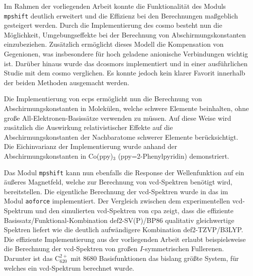 Im Rahmen der vorliegenden Arbeit konnte die Funktionalität des Moduls \texttt{mpshift} deutlich erweitert und die Effizienz bei den Berechnungen maßgeblich gesteigert werden. Durch die Implementierung des \acf{cosmo} besteht nun die Möglichkeit, Umgebungseffekte bei der Berechnung von Abschirmungskonstanten einzubeziehen. Zusätzlich ermöglicht dieses Modell die Kompensation von Gegenionen, was insbesondere für hoch geladene anionische Verbindungen wichtig ist. Darüber hinaus wurde das \acf{dcosmors} implementiert und in einer ausführlichen Studie mit dem \ac{cosmo} verglichen. Es konnte jedoch kein klarer Favorit innerhalb der beiden Methoden ausgemacht werden.

\bigskip
Die Implementierung von \acfp{ecp} ermöglicht nun die Berechnung von Abschirmungskonstanten in Molekülen, welche schwere Elemente beinhalten, ohne große All-Elektronen-Basissätze verwenden zu müssen. Auf diese Weise wird zusätzlich die Auswirkung relativistischer Effekte auf die Abschirmungskonstanten der Nachbaratome schwerer Elemente berücksichtigt. Die Eichinvarianz der Implementierung wurde anhand der Abschirmungskonstanten in Co(ppy)$_3$ (ppy=2-Phenylpyridin) demonstriert. 

\bigskip
Das Modul \texttt{mpshift} kann nun ebenfalls die Response der Wellenfunktion auf ein äußeres Magnetfeld, welche zur Berechnung von \ac{vcd}-Spektren benötigt wird, bereitstellen. Die eigentliche Berechnung der \ac{vcd}-Spektren wurde in das im Modul \texttt{aoforce} implementiert. Der Vergleich zwischen dem experimentellen \ac{vcd}-Spektrum und den simulierten \ac{vcd}-Spektren von \acl{cpa} zeigt, dass die effiziente Basissatz/Funktional-Kombination def2-SV(P)/BP86 qualitativ gleichwertige Spektren liefert wie die deutlich aufwändigere Kombination def2-TZVP/B3LYP. Die effiziente Implementierung aus der vorliegenden Arbeit erlaubt beispielsweise die Berechnung der \ac{vcd}-Spektren von großen $I$-symmetrischen Fullerenen. Darunter ist das C$_{620}^{2+}$ mit 8680 Basisfunktionen das bislang größte System, für welches ein \ac{vcd}-Spektrum berechnet wurde.

